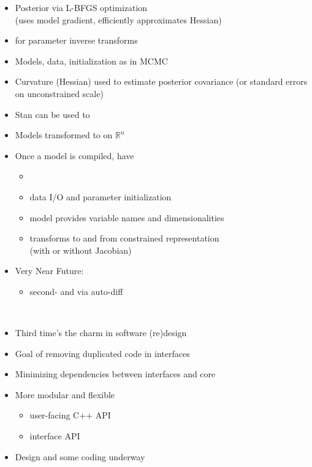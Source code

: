\documentclass[10pt]{report}
\newcommand{\sld}[1]{\newpage{\noindent\LARGE \ \ \
    \textcolor{MidnightBlue}{\bfseries #1}}\vspace*{4pt}}
\newcommand{\spc}{\hspace*{0.25in}}
\newcommand{\myemph}[1]{{\color{MidnightBlue}{\bfseries #1}}}
\newcommand{\mypart}[2]{{\newpage 
\mbox{ }
\vfill
\noindent\spc\color{MidnightBlue}{\LARGE\bfseries #1\\[10pt]\spc\Huge{#2}}
\vfill\vfill}
\mbox{ }}
\begin{document}
\sld{Penalized MLE}

\begin{itemize}
\item Posterior \myemph{mode finding} via L-BFGS optimization
\\ {\footnotesize (uses model gradient, efficiently approximates Hessian)}
\item \myemph{Disables Jacobians} for parameter inverse transforms
\item Models, data, initialization as in MCMC
\item Curvature (Hessian) used to estimate posterior covariance (or
  standard errors on unconstrained scale)
\end{itemize}

\sld{Stan as a Research Tool}

\begin{itemize}
\item Stan can be used to \myemph{explore algorithms}
\item Models transformed to \myemph{unconstrained support} on $\mathbb{R}^n$
\item Once a model is compiled, have
\vspace*{-4pt}
\begin{itemize}\small
\item \myemph{log probability, gradient, and Hessian}
\item data I/O and parameter initialization
\item model provides variable names and dimensionalities
\item transforms to and from constrained representation 
  \\ {\footnotesize (with or without Jacobian)}
\end{itemize}
\item {Very Near Future:}
\vspace*{-4pt}
\begin{itemize}\small
\item second- and \myemph{higher-order derivatives} via auto-diff
\end{itemize}
\end{itemize}





\mypart{Future:}{Stan 3 \& Beyond}

\sld{Stan 3: The Refactoring}
\begin{itemize}
\item Third time's the charm in software (re)design
\item Goal of removing duplicated code in interfaces
\item Minimizing dependencies between interfaces and core
\item More modular and flexible
\vspace*{-4pt}
\begin{itemize}\small
\item user-facing C++ API
\item interface API
\end{itemize}
\vfill
\item Design and some coding underway
\end{itemize}
\end{document}

